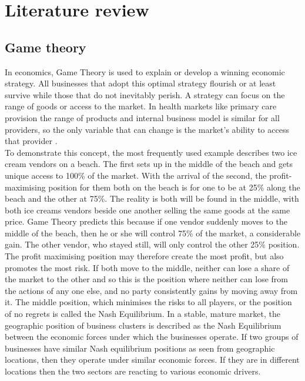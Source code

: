 \documentclass[11pt,a4paper]{article}
\begin{document}
\section{Literature review}
\subsection{Game theory}
In economics, Game Theory is used to explain or develop a winning economic strategy. All businesses that adopt this optimal strategy flourish or at least survive while those that do not inevitably perish. A strategy can focus on the range of goods or access to the market. In health markets like primary care provision the range of products and internal business model is similar for  all providers, so the  only variable that can change is the market's ability to access that provider \citep{dinar2008game}. \\


To demonstrate this concept, the most frequently used example describes two ice cream vendors on a beach. The first sets up in the middle of the beach and gets unique access to 100\% of the market. With the arrival of the second, the profit-maximising position for them both on the beach is for one to be at 25\% along the beach and the other at 75\%. The reality is both will be found in the middle, with both ice creams vendors beside one another selling the same goods at the same price. Game Theory predicts this because if one vendor suddenly moves to the middle of the beach, then he or she will control 75\% of the market, a considerable gain. The other vendor, who stayed still, will only control the other 25\% position. The profit maximising position may therefore create the most profit, but also promotes the most risk. If both move to the middle, neither can lose a share of the market to the other and so this is the position where neither can lose from the actions of any one else, and no party consistently gains by moving away from it. The middle position, which minimises the risks to all players, or the position of no regrets is called the Nash Equilibrium. In a stable, mature market, the geographic position of business clusters is described as the Nash Equilibrium between the economic forces under which the businesses operate. If two groups of businesses have similar Nash equilibrium positions as seen from geographic locations, then they operate under similar economic forces. If they are in different locations then the two sectors are reacting to various economic drivers. \\
\end{document}
